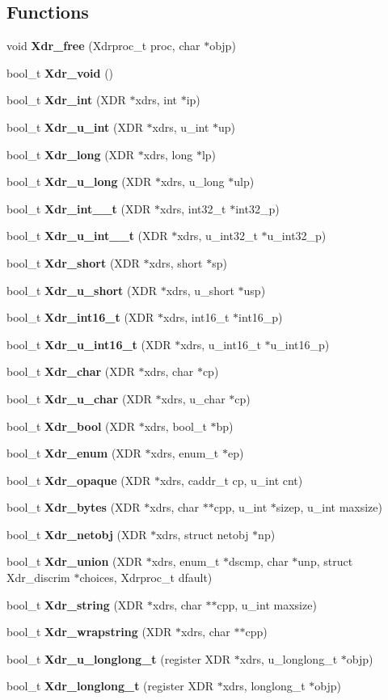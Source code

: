 \subsection*{Functions}
\begin{CompactItemize}
\item 
void {\bf Xdr\_\-free} (Xdrproc\_\-t proc, char $\ast$objp)
\item 
bool\_\-t {\bf Xdr\_\-void} ()
\item 
bool\_\-t {\bf Xdr\_\-int} (XDR $\ast$xdrs, int $\ast$ip)
\item 
bool\_\-t {\bf Xdr\_\-u\_\-int} (XDR $\ast$xdrs, u\_\-int $\ast$up)
\item 
bool\_\-t {\bf Xdr\_\-long} (XDR $\ast$xdrs, long $\ast$lp)
\item 
bool\_\-t {\bf Xdr\_\-u\_\-long} (XDR $\ast$xdrs, u\_\-long $\ast$ulp)
\item 
bool\_\-t {\bf Xdr\_\-int\_\_\-t} (XDR $\ast$xdrs, int32\_\-t $\ast$int32\_\-p)
\item 
bool\_\-t {\bf Xdr\_\-u\_\-int\_\_\-t} (XDR $\ast$xdrs, u\_\-int32\_\-t $\ast$u\_\-int32\_\-p)
\item 
bool\_\-t {\bf Xdr\_\-short} (XDR $\ast$xdrs, short $\ast$sp)
\item 
bool\_\-t {\bf Xdr\_\-u\_\-short} (XDR $\ast$xdrs, u\_\-short $\ast$usp)
\item 
bool\_\-t {\bf Xdr\_\-int16\_\-t} (XDR $\ast$xdrs, int16\_\-t $\ast$int16\_\-p)
\item 
bool\_\-t {\bf Xdr\_\-u\_\-int16\_\-t} (XDR $\ast$xdrs, u\_\-int16\_\-t $\ast$u\_\-int16\_\-p)
\item 
bool\_\-t {\bf Xdr\_\-char} (XDR $\ast$xdrs, char $\ast$cp)
\item 
bool\_\-t {\bf Xdr\_\-u\_\-char} (XDR $\ast$xdrs, u\_\-char $\ast$cp)
\item 
bool\_\-t {\bf Xdr\_\-bool} (XDR $\ast$xdrs, bool\_\-t $\ast$bp)
\item 
bool\_\-t {\bf Xdr\_\-enum} (XDR $\ast$xdrs, enum\_\-t $\ast$ep)
\item 
bool\_\-t {\bf Xdr\_\-opaque} (XDR $\ast$xdrs, caddr\_\-t cp, u\_\-int cnt)
\item 
bool\_\-t {\bf Xdr\_\-bytes} (XDR $\ast$xdrs, char $\ast$$\ast$cpp, u\_\-int $\ast$sizep, u\_\-int maxsize)
\item 
bool\_\-t {\bf Xdr\_\-netobj} (XDR $\ast$xdrs, struct netobj $\ast$np)
\item 
bool\_\-t {\bf Xdr\_\-union} (XDR $\ast$xdrs, enum\_\-t $\ast$dscmp, char $\ast$unp, struct Xdr\_\-discrim $\ast$choices, Xdrproc\_\-t dfault)
\item 
bool\_\-t {\bf Xdr\_\-string} (XDR $\ast$xdrs, char $\ast$$\ast$cpp, u\_\-int maxsize)
\item 
bool\_\-t {\bf Xdr\_\-wrapstring} (XDR $\ast$xdrs, char $\ast$$\ast$cpp)
\item 
bool\_\-t {\bf Xdr\_\-u\_\-longlong\_\-t} (register XDR $\ast$xdrs, u\_\-longlong\_\-t $\ast$objp)
\item 
bool\_\-t {\bf Xdr\_\-longlong\_\-t} (register XDR $\ast$xdrs, longlong\_\-t $\ast$objp)
\end{CompactItemize}


